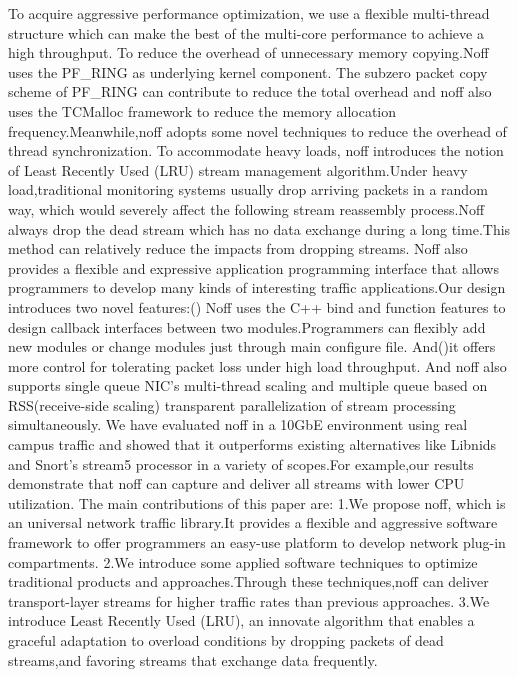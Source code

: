 \documentclass[conference]{IEEEtran}
\begin{document}
\newline\indent To acquire aggressive performance optimization, we use a flexible multi-thread structure which can make the best of the multi-core performance to achieve a high throughput.
\newline\indent To reduce the overhead of unnecessary memory copying.Noff uses the PF\_RING as underlying kernel component. The subzero packet copy scheme of PF\_RING can contribute to reduce the total overhead and noff also uses the TCMalloc\cite{Evans}\cite{Sangho} framework to reduce the memory allocation frequency.Meanwhile,noff adopts some novel techniques to reduce the overhead of thread synchronization. 
\newline\indent To accommodate heavy loads, noff introduces the notion of Least Recently Used (LRU) stream management algorithm.Under heavy load,traditional monitoring systems usually drop arriving packets in a random way, which would severely affect the following stream reassembly process.Noff always drop the dead stream which has no data exchange during a long time.This method can relatively reduce the impacts from dropping streams.
\newline\indent Noff also provides a flexible and expressive application programming interface that allows programmers to develop many kinds of interesting traffic applications.Our design introduces two novel features:(\uppercase\expandafter{}) Noff uses the C++ bind and function features to design callback interfaces between two modules.Programmers can flexibly add new modules or change modules just through main configure file. And(\uppercase\expandafter{})it offers more control for tolerating packet loss under high load throughput. And noff also supports single queue NIC's multi-thread scaling and multiple queue based on RSS(receive-side scaling)\cite{Server} transparent parallelization of stream processing simultaneously.
\newline\indent We have evaluated noff in a 10GbE environment using real campus traffic and showed that it outperforms existing alternatives like Libnids and Snort's\cite{snort} stream5 processor in a variety of scopes.For example,our results demonstrate that noff can capture and deliver all streams with lower CPU utilization.
The main contributions of this paper are:
\newline 1.We propose noff, which is an universal network traffic library.It provides a flexible and aggressive software framework to offer programmers an easy-use platform to develop network plug-in compartments.
\newline 2.We introduce some applied software techniques to optimize traditional products and approaches.Through these techniques,noff can deliver transport-layer streams for higher traffic rates than previous approaches.
\newline 3.We introduce Least Recently Used (LRU), an innovate algorithm that enables a graceful adaptation to overload conditions by dropping packets of dead streams,and favoring streams that exchange data frequently.
\end{document}
